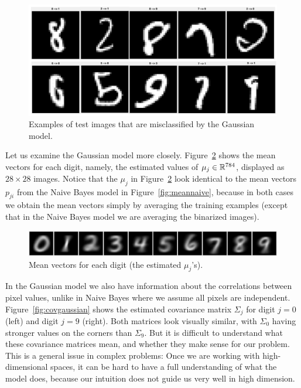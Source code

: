 \documentclass[11pt]{article}
\begin{document}
\begin{figure}[h!]
\centering
\includegraphics[scale=0.4]{gaussian_mis}
\caption{Examples of test images that are misclassified by the Gaussian model.}
\label{fig:gaussian_mis}
\end{figure}

Let us examine the Gaussian model more closely. Figure~\ref{fig:meangaussian} shows the mean vectors for each digit, namely, the estimated values of $\mu_j \in \mathbb{R}^{784}$, displayed as $28 \times 28$ images. Notice that the $\mu_j$ in Figure~\ref{fig:meangaussian} look identical to the mean vectors $p_{ji}$ from the Naive Bayes model in Figure~\ref{fig:meannaive}, because in both cases we obtain the mean vectors simply by averaging the training examples (except that in the Naive Bayes model we are averaging the binarized images).

\begin{figure}[h!]
\centering
\includegraphics[scale=0.4]{meangaussian}
\caption{Mean vectors for each digit (the estimated $\mu_j$'s).}
\label{fig:meangaussian}
\end{figure}

In the Gaussian model we also have information about the correlations between pixel values, unlike in Naive Bayes where we assume all pixels are independent. Figure~\ref{fig:covgaussian} shows the estimated covariance matrix $\Sigma_j$ for digit $j = 0$ (left) and digit $j = 9$ (right). Both matrices look visually similar, with $\Sigma_0$ having stronger values on the corners than $\Sigma_9$. But it is difficult to understand what these covariance matrices mean, and whether they make sense for our problem. This is a general issue in complex problems: Once we are working with high-dimensional spaces, it can be hard to have a full understanding of what the model does, because our intuition does not guide us very well in high dimension.
\end{document}
